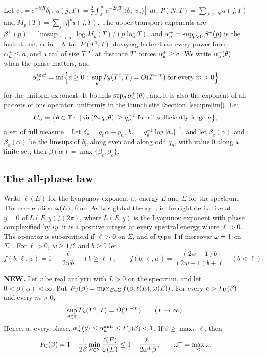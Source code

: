 Let $\psi_t=e^{-itH}\delta_0$, $a(j,T)=\frac2T\int_0^\infty e^{-2t/T}|\langle\delta_j,\psi_t\rangle|^2\,dt$, $P(N,T)=\sum_{|j|>N}a(j,T)$ and $M_p(T)=\sum_j|j|^pa(j,T)$. The upper transport exponents are $\beta^+(p)=\limsup_{T\to\infty}\log M_p(T)/(p\log T)$, and $\alpha_u^+=\sup_{p>0}\beta^+(p)$ is the fastest one, as in~\cite{DT2007,DMamo,DMuniv}. A tail $P(T^a,T)$ decaying faster than every power forces $\alpha_u^+\le a$, and a tail of size $T^{-C}$ at distance $T^a$ forces $\alpha_u^+\ge a$. We write $\alpha_u^+(\theta)$ when the phase matters, and
\[
\alpha_u^{\mathrm{unif}}=\inf\Bigl\{a\ge0:\ \sup_\theta P_\theta(T^a,T)=O(T^{-m})\text{ for every }m>0\Bigr\}
\]
for the uniform exponent. It bounds $\sup_\theta\alpha_u^+(\theta)$, and it is also the exponent of all packets of one operator, uniformly in the launch site (Section~\ref{sec:prelim}). Let
\begin{equation}\label{eq:Ga}
G_\alpha=\bigl\{\theta\in\mathbb T:\ |\sin(2\pi q_n\theta)|\ge q_n^{-2}\text{ for all sufficiently large }n\bigr\},
\end{equation}
a set of full measure~\cite[Lemma~2.1]{DMamo}. Let $\delta_n=q_n\alpha-p_n$, $b_n=q_n^{-1}\log|\delta_n|^{-1}$, and let $\beta_e(\alpha)$ and $\beta_o(\alpha)$ be the limsups of $b_n$ along even and along odd $q_n$, with value $0$ along a finite set; then $\beta(\alpha)=\max\{\beta_e,\beta_o\}$.

\subsection{The all-phase law}

Write $\ell(E)$ for the Lyapunov exponent at energy $E$ and $\Sigma$ for the spectrum. The acceleration $\omega(E)$, from Avila's global theory~\cite{Avila2015}, is the right derivative at $y=0$ of $L(E,y)/(2\pi)$, where $L(E,y)$ is the Lyapunov exponent with phase complexified by $iy$; it is a positive integer at every spectral energy where $\ell>0$. The operator is supercritical if $\ell>0$ on $\Sigma$, and of type~I if moreover $\omega=1$ on $\Sigma$~\cite{GeJitomirskaya2024}. For $\ell>0$, $w\ge1/2$ and $b\ge0$ let
\[
f(b;\ell,w)=1-\frac{\ell}{2wb}\quad(b\ge\ell),\qquad f(b;\ell,w)=\frac{(2w-1)b}{(2w-1)b+\ell}\quad(b<\ell).
\]

\begin{maintheorem}\label{thm:A}
\textbf{NEW.} Let $v$ be real analytic with $L>0$ on the spectrum, and let $0<\beta(\alpha)<\infty$. Put $F_{\mathrm U}(\beta)=\max_{E\in\Sigma}f(\beta;\ell(E),\omega(E))$. For every $a>F_{\mathrm U}(\beta)$ and every $m>0$,
\[
\sup_{\theta\in\mathbb T}P_\theta(T^a,T)=O(T^{-m})\qquad(T\to\infty).
\]
Hence, at every phase, $\alpha_u^+(\theta)\le\alpha_u^{\mathrm{unif}}\le F_{\mathrm U}(\beta)<1$. If $\beta\ge\max_\Sigma\ell$, then
\[
F_{\mathrm U}(\beta)=1-\frac1{2\beta}\min_{E\in\Sigma}\frac{\ell(E)}{\omega(E)}\le1-\frac{\ell_*}{2\omega^+\beta},\qquad\omega^+=\max_\Sigma\omega .
\]
\end{maintheorem}

